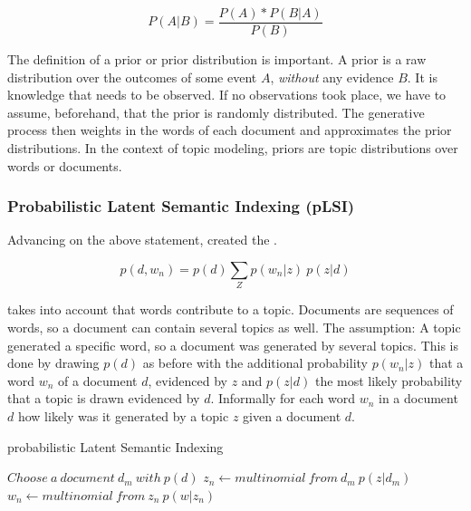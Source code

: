           \begin{equation}
            P(A|B) = \frac{P(A) * P(B|A)}{P(B)}
          \end{equation}
        
        The definition of a prior or prior distribution is important. A prior is a raw distribution over the outcomes of some event $A$, \emph{without} any evidence $B$. It is knowledge that needs to be observed. If no observations took place, we have to assume, beforehand, that the prior is randomly distributed. The generative process then weights in the words of each document and approximates the prior distributions. In the context of topic modeling, priors are topic distributions over words or documents.\\ 
        
      \subsubsection*{Probabilistic Latent Semantic Indexing (pLSI)}
      Advancing on the above statement, \cite{PLSA2001} created the \plsifull{}.

        \begin{equation}
          p(d, w_n) = p(d)\sum_{Z} p(w_n|z)\:p(z|d)
        \end{equation} 

      \plsi{} takes into account that words contribute to a topic. Documents are sequences of words, so a document can contain several topics as well. The assumption: A topic generated a specific word, so a document was generated by several topics. This is done by drawing $p(d)$ as before with the additional probability $p(w_n|z)$ that a word $w_n$ of a document $d$, evidenced by $z$ and $p(z|d)$ the most likely probability that a topic is drawn evidenced by $d$. Informally for each word $w_n$ in a document $d$ how likely was it generated by a topic $z$ given a document $d$.

      \begin{algorithm}[H]
      \begin{algorithmic}[1]
        \caption{probabilistic Latent Semantic Indexing}\label{PLSI}
        \State $Choose\:a\:document\:d_m\:with\:p(d)$
            \State $z_n \gets multinomial\:from\:d_m\:p(z|d_m)$
            \State $w_n \gets multinomial\:from\:z_n\:p(w|z_n)$
          \EndFor
      \end{algorithmic}
      \end{algorithm}


